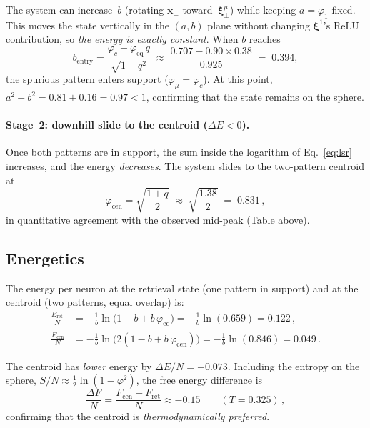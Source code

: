 \documentclass[11pt]{article}
\newcommand{\bxi}{\boldsymbol{\xi}}
\newcommand{\bx}{\mathbf{x}}
\begin{document}
The system can increase~$b$ (rotating $\bx_\perp$ toward~$\bxi^\mu_\perp$) while keeping $a = \varphi_1$ fixed.  This moves the state vertically in the $(a,b)$ plane without changing $\bxi^1$'s ReLU contribution, so \emph{the energy is exactly constant}.  When $b$ reaches
\begin{equation}
b_{\mathrm{entry}} = \frac{\varphi_c - \varphi_{\mathrm{eq}}\,q}{\sqrt{1-q^2}}
\;\approx\; \frac{0.707 - 0.90 \times 0.38}{0.925} \;=\; 0.394,
\end{equation}
the spurious pattern enters support ($\varphi_\mu = \varphi_c$).  At this point, $a^2 + b^2 = 0.81 + 0.16 = 0.97 < 1$, confirming that the state remains on the sphere.

\paragraph{Stage~2: downhill slide to the centroid ($\Delta E < 0$).}
Once both patterns are in support, the sum inside the logarithm of Eq.~\eqref{eq:lsr} increases, and the energy \emph{decreases}.  The system slides to the two-pattern centroid at
\begin{equation}
\varphi_{\mathrm{cen}} = \sqrt{\frac{1+q}{2}} \;\approx\; \sqrt{\frac{1.38}{2}} \;=\; 0.831\,,
\label{eq:phi_cen}
\end{equation}
in quantitative agreement with the observed mid-peak (Table above).

\subsection{Energetics}

The energy per neuron at the retrieval state (one pattern in support) and at the centroid (two patterns, equal overlap) is:
\begin{align}
\frac{E_{\mathrm{ret}}}{N} &= -\frac{1}{b}\ln\!\big(1 - b + b\,\varphi_{\mathrm{eq}}\big)
= -\frac{1}{b}\ln(0.659) = 0.122\,, \\
\frac{E_{\mathrm{cen}}}{N} &= -\frac{1}{b}\ln\!\big(2(1 - b + b\,\varphi_{\mathrm{cen}})\big)
= -\frac{1}{b}\ln(0.846) = 0.049\,.
\end{align}

The centroid has \emph{lower} energy by $\Delta E/N = -0.073$.  Including the entropy on the sphere, $S/N \approx \tfrac{1}{2}\ln(1-\varphi^2)$, the free energy difference is
\begin{equation}
\frac{\Delta F}{N} = \frac{F_{\mathrm{cen}} - F_{\mathrm{ret}}}{N} \approx -0.15
\qquad (T = 0.325)\,,
\end{equation}
confirming that the centroid is \emph{thermodynamically preferred}.
\end{document}
